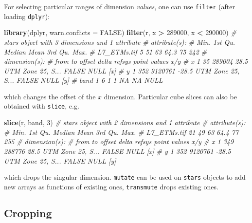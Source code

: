 \documentclass[]{book}
\newenvironment{Shaded}{\begin{snugshade}}{\end{snugshade}}
\newcommand{\CommentTok}[1]{\textcolor[rgb]{0.56,0.35,0.01}{\textit{#1}}}
\newcommand{\DataTypeTok}[1]{\textcolor[rgb]{0.13,0.29,0.53}{#1}}
\newcommand{\DecValTok}[1]{\textcolor[rgb]{0.00,0.00,0.81}{#1}}
\newcommand{\KeywordTok}[1]{\textcolor[rgb]{0.13,0.29,0.53}{\textbf{#1}}}
\newcommand{\NormalTok}[1]{#1}
\newcommand{\OperatorTok}[1]{\textcolor[rgb]{0.81,0.36,0.00}{\textbf{#1}}}
\newcommand{\OtherTok}[1]{\textcolor[rgb]{0.56,0.35,0.01}{#1}}
\newcommand{\StringTok}[1]{\textcolor[rgb]{0.31,0.60,0.02}{#1}}
\begin{document}
For selecting particular ranges of dimension \emph{values}, one can use
\texttt{filter} (after loading \texttt{dplyr}):

\begin{Shaded}
\begin{Highlighting}[]
\KeywordTok{library}\NormalTok{(dplyr, }\DataTypeTok{warn.conflicts =} \OtherTok{FALSE}\NormalTok{)}
\KeywordTok{filter}\NormalTok{(r, x }\OperatorTok{>}\StringTok{ }\DecValTok{289000}\NormalTok{, x }\OperatorTok{<}\StringTok{ }\DecValTok{290000}\NormalTok{)}
\CommentTok{# stars object with 3 dimensions and 1 attribute}
\CommentTok{# attribute(s):}
\CommentTok{#              Min. 1st Qu. Median Mean 3rd Qu. Max.}
\CommentTok{# L7_ETMs.tif     5      51     63 64.3      75  242}
\CommentTok{# dimension(s):}
\CommentTok{#      from  to  offset delta            refsys point values x/y}
\CommentTok{# x       1  35  289004  28.5 UTM Zone 25, S... FALSE   NULL [x]}
\CommentTok{# y       1 352 9120761 -28.5 UTM Zone 25, S... FALSE   NULL [y]}
\CommentTok{# band    1   6       1     1                NA    NA   NULL}
\end{Highlighting}
\end{Shaded}

which changes the offset of the \(x\) dimension. Particular cube slices
can also be obtained with \texttt{slice}, e.g.

\begin{Shaded}
\begin{Highlighting}[]
\KeywordTok{slice}\NormalTok{(r, band, }\DecValTok{3}\NormalTok{)}
\CommentTok{# stars object with 2 dimensions and 1 attribute}
\CommentTok{# attribute(s):}
\CommentTok{#              Min. 1st Qu. Median Mean 3rd Qu. Max.}
\CommentTok{# L7_ETMs.tif    21      49     63 64.4      77  255}
\CommentTok{# dimension(s):}
\CommentTok{#   from  to  offset delta            refsys point values x/y}
\CommentTok{# x    1 349  288776  28.5 UTM Zone 25, S... FALSE   NULL [x]}
\CommentTok{# y    1 352 9120761 -28.5 UTM Zone 25, S... FALSE   NULL [y]}
\end{Highlighting}
\end{Shaded}

which drops the singular dimension. \texttt{mutate} can be used on \texttt{stars}
objects to add new arrays as functions of existing ones, \texttt{transmute}
drops existing ones.

\hypertarget{cropping}{%
\subsection{Cropping}\label{cropping}}
\end{document}
